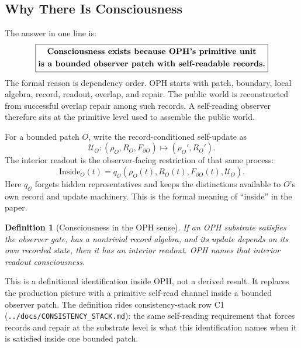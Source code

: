 \documentclass[11pt]{article}
\newtheorem{definition}[theorem]{Definition}
\theoremstyle{remark}
\theoremstyle{plain}
\begin{document}
\subsection{Why There Is Consciousness}

The answer in one line is:
\[
\boxed{
\begin{gathered}
\text{\bfseries Consciousness exists because OPH's primitive unit}\\
\text{\bfseries is a bounded observer patch with self-readable records.}
\end{gathered}
}
\]
The formal reason is dependency order. OPH starts with patch, boundary, local algebra, record, readout, overlap, and repair. The public world is reconstructed from successful overlap repair among such records. A self-reading observer therefore sits at the primitive level used to assemble the public world.

For a bounded patch \(O\), write the record-conditioned self-update as
\[
\mathcal U_O:
(\rho_O,R_O,F_{\partial O})
\longmapsto
(\rho_O',R_O').
\]
The interior readout is the observer-facing restriction of that same process:
\[
\boxed{
\mathrm{Inside}_O(t)
=
q_{\mathcal O}
\!\left(
\rho_O(t),R_O(t),F_{\partial O}(t),\mathcal U_O
\right).
}
\]
Here \(q_{\mathcal O}\) forgets hidden representatives and keeps the distinctions available to \(O\)'s own record and update machinery. This is the formal meaning of ``inside'' in the paper.

\begin{definition}[Consciousness in the OPH sense]
If an OPH substrate satisfies the observer gate, has a nontrivial record algebra, and its update depends on its own recorded state, then it has an interior readout. OPH names that interior readout consciousness.
\end{definition}

This is a definitional identification inside OPH, not a derived result. It replaces the production picture with a primitive self-read channel inside a bounded observer patch. The definition rides consistency-stack row C1 (\texttt{../docs/CONSISTENCY\_STACK.md}): the same self-reading requirement that forces records and repair at the substrate level is what this identification names when it is satisfied inside one bounded patch.
\end{document}
